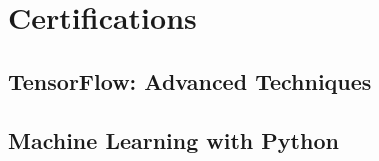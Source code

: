 \documentclass[]{deedy-resume-openfont}
\begin{document}
\begin{minipage}[t]{0.33\textwidth}
\section{Certifications}
\subsection{TensorFlow: Advanced Techniques}
\sectionsep
\subsection{Machine Learning with Python}
\sectionsep

\end{minipage}
\hfill
\end{document}
